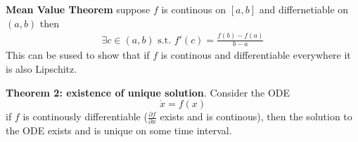 \textbf{Mean Value Theorem} 
suppose \(f\) is continous on \([a,b]\) and differnetiable on \((a,b)\) then
\begin{align*}
    \exists c\in(a,b) \textrm{ s.t. } f'(c)=\frac{f(b)-f(a)}{b-a}
\end{align*}
This can be sused to show that if \(f\) is continous and differentiable everywhere it is also Lipschitz.
\newline

\textbf{Theorem 2: existence of unique solution}. Consider the ODE
\[\dot{x}=f(x)\]
if \(f\) is continously differentiable (\(\frac{\partial f}{\partial x}\) exists and is continous), then the solution to the ODE exists and is unique on some time interval.

